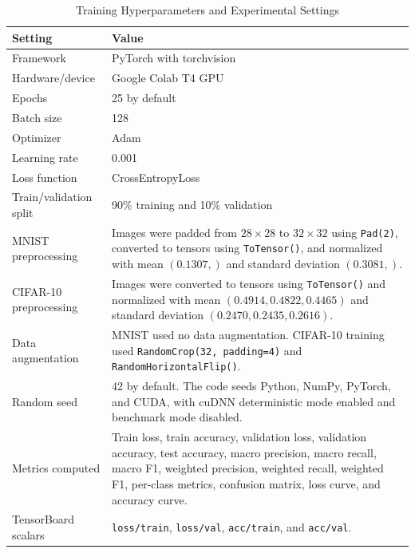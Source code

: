 \begin{table}[t]
\centering
\caption{Training Hyperparameters and Experimental Settings}
\label{tab:hyperparameters}
\begin{tabularx}{\textwidth}{>{\raggedright\arraybackslash}p{} X}
\toprule
\textbf{Setting} & \textbf{Value} \\
\midrule
Framework & PyTorch with torchvision \\
Hardware/device & Google Colab T4 GPU \\
Epochs & 25 by default \\
Batch size & 128 \\
Optimizer & Adam \\
Learning rate & 0.001 \\
Loss function & CrossEntropyLoss \\
Train/validation split & 90\% training and 10\% validation \\
MNIST preprocessing & Images were padded from $28 \times 28$ to $32 \times 32$ using \texttt{Pad(2)}, converted to tensors using \texttt{ToTensor()}, and normalized with mean $(0.1307,)$ and standard deviation $(0.3081,)$. \\
CIFAR-10 preprocessing & Images were converted to tensors using \texttt{ToTensor()} and normalized with mean $(0.4914, 0.4822, 0.4465)$ and standard deviation $(0.2470, 0.2435, 0.2616)$. \\
Data augmentation & MNIST used no data augmentation. CIFAR-10 training used \texttt{RandomCrop(32, padding=4)} and \texttt{RandomHorizontalFlip()}. \\
Random seed & 42 by default. The code seeds Python, NumPy, PyTorch, and CUDA, with cuDNN deterministic mode enabled and benchmark mode disabled. \\
Metrics computed & Train loss, train accuracy, validation loss, validation accuracy, test accuracy, macro precision, macro recall, macro F1, weighted precision, weighted recall, weighted F1, per-class metrics, confusion matrix, loss curve, and accuracy curve. \\
TensorBoard scalars & \texttt{loss/train}, \texttt{loss/val}, \texttt{acc/train}, and \texttt{acc/val}. \\
\bottomrule
\end{tabularx}
\end{table}